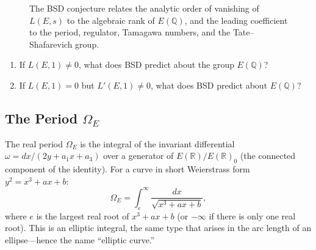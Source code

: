 \begin{figure}[htbp]
\centering
{}
\caption{The BSD conjecture relates the analytic order of vanishing of $L(E,s)$ to the algebraic rank of $E(\mathbb{Q})$, and the leading coefficient to the period, regulator, Tamagawa numbers, and the Tate--Shafarevich group.}
\label{fig:bsd-relationship}
\end{figure}

\begin{checkyou}
\begin{enumerate}
\item If $L(E,1) \ne 0$, what does BSD predict about the group $E(\mathbb{Q})$?
\item If $L(E,1) = 0$ but $L'(E,1) \ne 0$, what does BSD predict about $E(\mathbb{Q})$?
\end{enumerate}
\end{checkyou}

\subsection{The Period $\Omega_E$}

The real period $\Omega_E$ is the integral of the invariant differential $\omega = dx/(2y + a_1 x + a_3)$ over a generator of $E(\mathbb{R})/E(\mathbb{R})_0$ (the connected component of the identity). For a curve in short Weierstrass form $y^2 = x^3 + ax + b$:
\[
\Omega_E = \int_{e}^{\infty} \frac{dx}{\sqrt{x^3 + ax + b}},
\]
where $e$ is the largest real root of $x^3 + ax + b$ (or $-\infty$ if there is only one real root). This is an elliptic integral, the same type that arises in the arc length of an ellipse---hence the name ``elliptic curve.''

